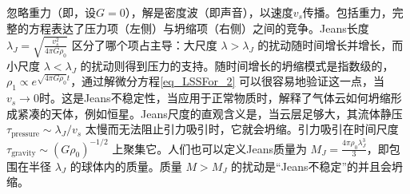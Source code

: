 忽略重力（即，设$G=0$），解是密度波（即声音），以速度$v_s$传播。包括重力，完整的方程表达了压力项（左侧）与坍缩项（右侧）之间的竞争。Jeans长度 \( \lambda_J = \sqrt{\frac{v^2_s}{4\pi G \rho_0}} \) 区分了哪个项占主导：大尺度 \( \lambda > \lambda_J \) 的扰动随时间增长并增长，而小尺度 \( \lambda < \lambda_J \) 的扰动则得到压力的支持。随时间增长的坍缩模式是指数级的，\( \rho_1 \propto e^{\sqrt{4\pi G \rho_0} t} \)，通过解微分方程\autoref{eq_LSSFor_2} 可以很容易地验证这一点，当$v_s \rightarrow 0$时。这是Jeans不稳定性，当应用于正常物质时，解释了气体云如何坍缩形成紧凑的天体，例如恒星。Jeans尺度的直观含义是，当云层足够大，其流体静压 \( \tau_{\text{pressure}} \sim \lambda_J / v_s \) 太慢而无法阻止引力吸引时，它就会坍缩。引力吸引在时间尺度 \( \tau_{\text{gravity}} \sim (G\rho_0)^{-1/2} \) 上聚集它。人们也可以定义Jeans质量为 \( M_J = \frac{4\pi \rho_0 \lambda^3_J}{3} \)，即包围在半径 \( \lambda_J \) 的球体内的质量。质量 \( M > M_J \) 的扰动是“Jeans不稳定”的并且会坍缩。

 

